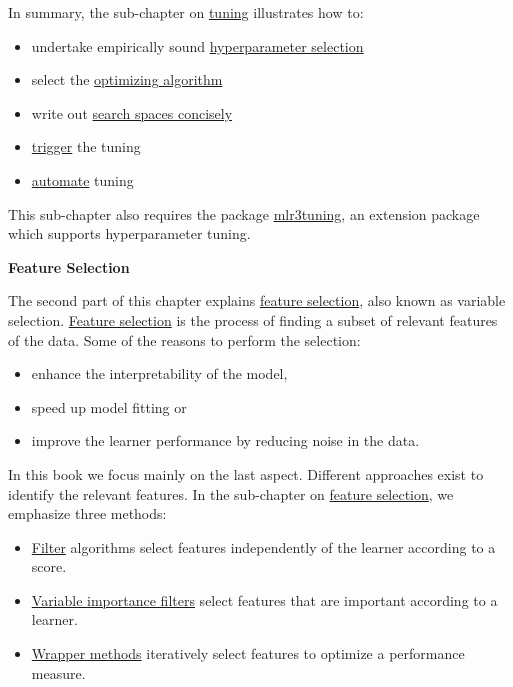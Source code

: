 \documentclass[
]{scrbook}
\providecommand{\tightlist}{%
  \setlength{\itemsep}{0pt}\setlength{\parskip}{0pt}}
\begin{document}
In summary, the sub-chapter on \protect\hyperlink{tuning}{tuning} illustrates how to:

\begin{itemize}
\tightlist
\item
  undertake empirically sound \protect\hyperlink{tuning}{hyperparameter selection}
\item
  select the \protect\hyperlink{tuning-optimization}{optimizing algorithm}
\item
  write out \protect\hyperlink{searchspace}{search spaces concisely}
\item
  \protect\hyperlink{tuning-triggering}{trigger} the tuning
\item
  \protect\hyperlink{autotuner}{automate} tuning
\end{itemize}

This sub-chapter also requires the package \href{https://mlr3tuning.mlr-org.com}{mlr3tuning}, an extension package which supports hyperparameter tuning.

\textbf{Feature Selection}

The second part of this chapter explains \protect\hyperlink{fs}{feature selection}, also known as variable selection.
\protect\hyperlink{fs}{Feature selection} is the process of finding a subset of relevant features of the data.
Some of the reasons to perform the selection:

\begin{itemize}
\tightlist
\item
  enhance the interpretability of the model,
\item
  speed up model fitting or
\item
  improve the learner performance by reducing noise in the data.
\end{itemize}

In this book we focus mainly on the last aspect.
Different approaches exist to identify the relevant features.
In the sub-chapter on \protect\hyperlink{fs}{feature selection}, we emphasize three methods:

\begin{itemize}
\tightlist
\item
  \protect\hyperlink{fs-filter}{Filter} algorithms select features independently of the learner according to a score.
\item
  \protect\hyperlink{fs-var-imp-filters}{Variable importance filters} select features that are important according to a learner.
\item
  \protect\hyperlink{fs-wrapper}{Wrapper methods} iteratively select features to optimize a performance measure.
\end{itemize}
\end{document}
